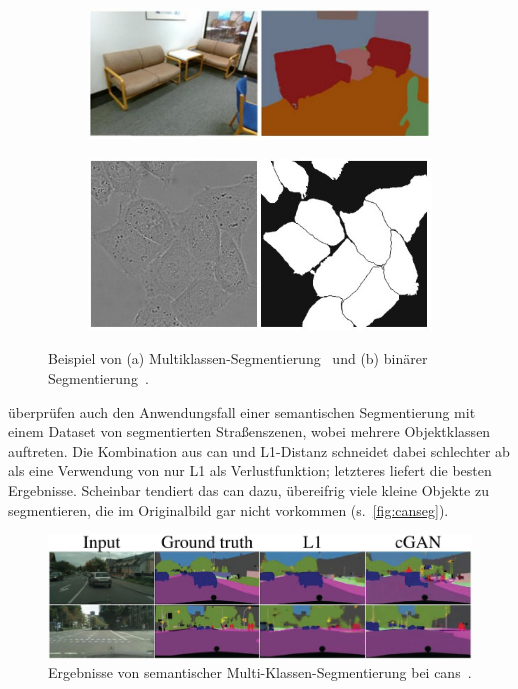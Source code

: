 \begin{figure}
	\centering
	\begin{subfigure}{.45\textwidth}
		\centering
		\includegraphics[width=0.9\linewidth]{img/segnet_multiclassseg}
		\caption{}
		\label{fig:segnet_multiclassseg}
	\end{subfigure}
	\begin{subfigure}{.45\textwidth}
		\centering
		\includegraphics[width=0.9\linewidth]{img/unet_binaryseg}
		\caption{}
		\label{fig:unet_binaryseg}
	\end{subfigure}
	\caption{Beispiel von (a) Multiklassen-Segmentierung~\cite{Badrinarayanan.2017} und (b) binärer Segmentierung~\cite{Ronneberger.2015}.}
\end{figure}

\citeauthor{Isola.2017} überprüfen auch den Anwendungsfall einer semantischen Segmentierung mit einem Dataset von segmentierten Straßenszenen, wobei mehrere Objektklassen auftreten.
Die Kombination aus \gls{can} und L1-Distanz schneidet dabei schlechter ab als eine Verwendung von nur L1 als Verlustfunktion; letzteres liefert die besten Ergebnisse.
Scheinbar tendiert das \gls{can} dazu, übereifrig viele kleine Objekte zu segmentieren, die im Originalbild gar nicht vorkommen (s.~\autoref{fig:canseg}).

\begin{figure}
	\centering
	\includegraphics[width=0.9\linewidth]{img/can_seg}
	\caption{Ergebnisse von semantischer Multi-Klassen-Segmentierung bei \glspl{can}~\cite{Isola.2017}.}
	\label{fig:canseg}
\end{figure}

